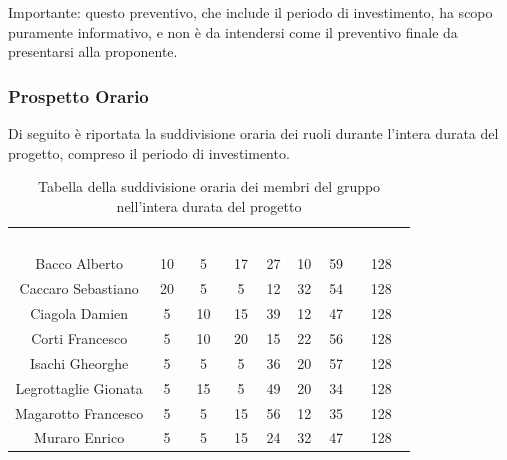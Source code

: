 Importante: questo preventivo, che include il periodo di investimento, ha scopo puramente informativo, e non è da intendersi come il preventivo finale da presentarsi alla proponente.
\subsubsection{Prospetto Orario}
Di seguito è riportata la suddivisione oraria dei ruoli durante l'intera durata del progetto, compreso il periodo di investimento.




\begin{table}[H]	
	\begin{center}
	    \begin{tabular}{cccccccc}
			\rowcolor{greySWEight}
			\textcolor{white}{\textbf{Nome}} & \textcolor{white}{\textbf{Re}} & \textcolor{white}{\textbf{Am}} & \textcolor{white}{\textbf{An}} & \textcolor{white}{\textbf{Pj}} & \textcolor{white}{\textbf{Pr}} & \textcolor{white}{\textbf{Ve}} & \textcolor{white}{\textbf{Totale}}
			\\
			Bacco Alberto & 10 & 5 & 17 & 27 & 10 & 59 & 128 \\
			Caccaro Sebastiano & 20 & 5 & 5 & 12 & 32 & 54 & 128 \\
			Ciagola Damien & 5 & 10 & 15 & 39 & 12 & 47 & 128 \\
			Corti Francesco & 5 & 10 & 20 & 15 & 22 & 56 & 128 \\
			Isachi Gheorghe & 5 & 5 & 5 & 36 & 20 & 57 & 128 \\
			Legrottaglie Gionata & 5 & 15 & 5 & 49 & 20 & 34 & 128 \\
			Magarotto Francesco & 5 & 5 & 15 & 56 & 12 & 35 & 128 \\
			Muraro Enrico & 5 & 5 & 15 & 24 & 32 & 47 & 128 \\
						\end{tabular}
	    \caption{Tabella della suddivisione oraria dei membri del gruppo nell'intera durata del progetto} \label{tab:tabellaProgInt} 
	\end{center}
\end{table}

